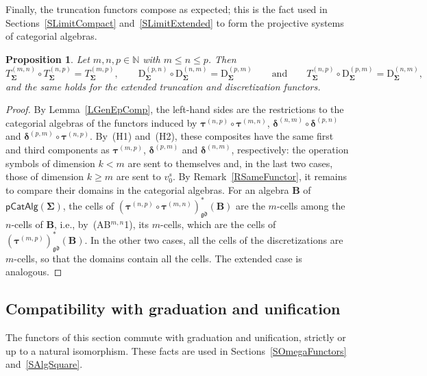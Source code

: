 \documentclass{amsart}
\theoremstyle{plain}
\newtheorem{proposition}[theorem]{Proposition}
\theoremstyle{definition}
\begin{document}
Finally, the truncation functors compose as expected; this is the fact used in Sections~\ref{SLimitCompact} and~\ref{SLimitExtended} to form the projective systems of categorial algebras.

\begin{proposition}\label{PTruncComp}
Let $m,n,p\in\mathbb{N}$ with $m\leq n\leq p$. Then
$$
T^{(m,n)}_{\mathbf{\Sigma}}\circ T^{(n,p)}_{\mathbf{\Sigma}}=T^{(m,p)}_{\mathbf{\Sigma}},
\qquad
\mathrm{D}^{(p,n)}_{\mathbf{\Sigma}}\circ\mathrm{D}^{(n,m)}_{\mathbf{\Sigma}}=\mathrm{D}^{(p,m)}_{\mathbf{\Sigma}}
\qquad\text{and}\qquad
T^{(n,p)}_{\mathbf{\Sigma}}\circ\mathrm{D}^{(p,m)}_{\mathbf{\Sigma}}=\mathrm{D}^{(n,m)}_{\mathbf{\Sigma}},
$$
and the same holds for the extended truncation and discretization functors.
\end{proposition}
\begin{proof}
By Lemma~\ref{LGenEpComp}, the left-hand sides are the restrictions to the categorial algebras of the functors induced by $\boldsymbol{\tau}^{(n,p)}\circ\boldsymbol{\tau}^{(m,n)}$, $\boldsymbol{\delta}^{(n,m)}\circ\boldsymbol{\delta}^{(p,n)}$ and $\boldsymbol{\delta}^{(p,m)}\circ\boldsymbol{\tau}^{(n,p)}$. By~(H1) and~(H2), these composites have the same first and third components as $\boldsymbol{\tau}^{(m,p)}$, $\boldsymbol{\delta}^{(p,m)}$ and $\boldsymbol{\delta}^{(n,m)}$, respectively: the operation symbols of dimension $k<m$ are sent to themselves and, in the last two cases, those of dimension $k\geq m$ are sent to $v^{s}_{0}$. By Remark~\ref{RSameFunctor}, it remains to compare their domains in the categorial algebras. For an algebra $\mathbf{B}$ of $\mathsf{pCatAlg}(\mathbf{\Sigma})$, the cells of $(\boldsymbol{\tau}^{(n,p)}\circ\boldsymbol{\tau}^{(m,n)})^{\ast}_{\mathfrak{gd}}(\mathbf{B})$ are the $m$-cells among the $n$-cells of $\mathbf{B}$, i.e., by~(AB$^{m,n}$1), its $m$-cells, which are the cells of $(\boldsymbol{\tau}^{(m,p)})^{\ast}_{\mathfrak{gd}}(\mathbf{B})$. In the other two cases, all the cells of the discretizations are $m$-cells, so that the domains contain all the cells. The extended case is analogous.
\end{proof}

\subsection{Compatibility with graduation and unification}\label{SCompatGdUf}

The functors of this section commute with graduation and unification, strictly or up to a natural isomorphism. These facts are used in Sections~\ref{SOmegaFunctors} and~\ref{SAlgSquare}.
\end{document}
